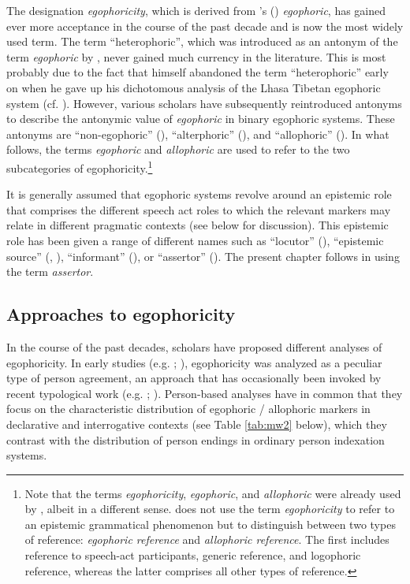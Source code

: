 \documentclass[output=paper]{langsci/langscibook}
\begin{document}
The designation \emph{egophoricity}, which is derived from \citeauthor{Tournadre1991}’s (\citeyear{Tournadre1991}) \emph{egophoric}, has gained ever more acceptance in the course of the past decade and is now the most widely used term. The term “heterophoric”, which was introduced as an antonym of the term \emph{egophoric} by \cite{Tournadre1991}, never gained much currency in the literature. This is most probably due to the fact that \citeauthor{Tournadre1991} himself abandoned the term “heterophoric” early on when he gave up his dichotomous analysis of the Lhasa Tibetan egophoric system (cf. \citealt[301, fn. 48]{Tournadre2008}). However, various scholars have subsequently reintroduced antonyms to describe the antonymic value of \emph{egophoric} in binary egophoric systems. These antonyms are “non-egophoric” (\citealt{SanRoque2018}), “alterphoric” (\citealt{Post2013}), and “allophoric” (\citealt{Widmer2017a}). In what follows, the terms \emph{egophoric} and \emph{allophoric} are used to refer to the two subcategories of egophoricity.\footnote{Note that the terms \emph{egophoricity}, \emph{egophoric}, and \emph{allophoric} were already used by \cite{Dahl2000}, albeit in a different sense. \citeauthor{Dahl2000} does not use the term \emph{egophoricity} to refer to an epistemic grammatical phenomenon but to distinguish between two types of reference: \emph{egophoric reference} and \emph{allophoric reference}. The first includes reference to speech-act participants, generic reference, and logophoric reference, whereas the latter comprises all other types of reference.}

It is generally assumed that egophoric systems revolve around an epistemic role that comprises the different speech act roles to which the relevant markers may relate in different pragmatic contexts (see below for discussion). This epistemic role has been given a range of different names such as “locutor” (\citealt{Curnow1997}), “epistemic source” (\citealt{Hargreaves1991}, \citealt{Hargreaves2005}), “informant” (\citealt{BickelNichols2007}), or “assertor” (\citealt{Creissels2008}). The present chapter follows \cite{Creissels2008} in using the term \emph{assertor}.

\subsection{Approaches to egophoricity}\label{s:mw2-2}

In the course of the past decades, scholars have proposed different analyses of egophoricity. In early studies (e.g. \citealt{HaleWatters1973}; \citealt{Hale1980}), egophoricity was analyzed as a peculiar type of person agreement, an approach that has occasionally been invoked by recent typological work (e.g. \citealt{Aikhenvald2004}; \citealt{BickelNichols2007}). Person-based analyses have in common that they focus on the characteristic distribution of egophoric / allophoric markers in declarative and interrogative contexts (see Table \ref{tab:mw2} below), which they contrast with the distribution of person endings in ordinary person indexation systems.
\end{document}

